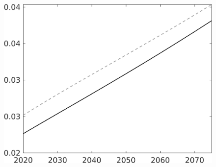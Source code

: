 \documentclass[12pt]{article}
\begin{document}
\begin{figure}
\begin{minipage}[]{0.32\textwidth}
\end{minipage}
\begin{minipage}[]{0.32\textwidth}
\includegraphics[width=1\textwidth]{../../codding_model/own_basedOnFried/optimalPol_010922_revision/figures/all_13Sept22/LevTaufNoTauf_TaulCalib_Equlab_regime0_wsn_spillover0_nsk0_xgr0_knspil1_sep1_LFlimit0_emsbase0_countec0_GovRev0_etaa0.79_lgd0.png}
\end{minipage}
\end{figure}
\clearpage \newpage
\end{document}
